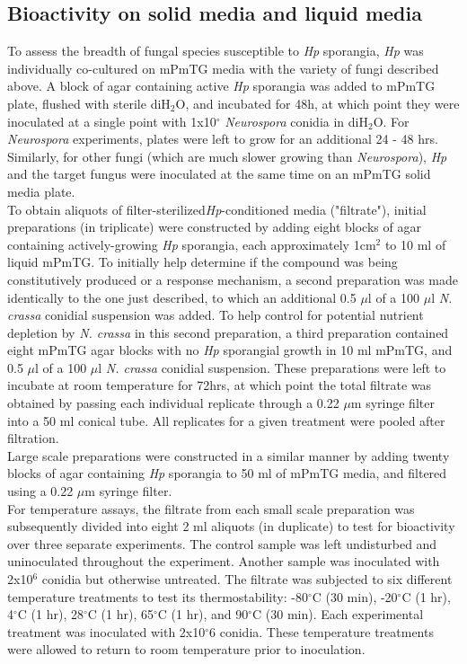 \subsection*{Bioactivity on solid media and liquid media}
To assess the breadth of fungal species susceptible to \textit{Hp} sporangia, \textit{Hp} was individually co-cultured on mPmTG media with the variety of fungi described above. A block of agar containing active \textit{Hp} sporangia was added to mPmTG plate, flushed with sterile diH$_{2}$O, and incubated for 48h, at which point they were inoculated at a single point with 1x10$^{\circ}$ \textit{Neurospora} conidia in diH$_{2}$O. For \textit{Neurospora} experiments, plates were left to grow for an additional 24 - 48 hrs.\\
\indent Similarly, for other fungi (which are much slower growing than \textit{Neurospora}), \textit{Hp} and the target fungus were inoculated at the same time on an mPmTG solid media plate.\\
\indent To obtain aliquots of filter-sterilized\textit{Hp}-conditioned media ("filtrate"), initial preparations (in triplicate) were constructed by adding eight blocks of agar containing actively-growing \textit{Hp} sporangia, each approximately 1cm$^{2}$ to 10 ml of liquid mPmTG. To initially help determine if the compound was being constitutively produced or a response mechanism, a second preparation was made identically to the one just described, to which an additional 0.5 $\mu$l of a 100 $\mu$l  \textit{N. crassa} conidial suspension was added. To help control for potential nutrient depletion by \textit{N. crassa} in this second preparation, a third preparation contained eight mPmTG agar blocks with no \textit{Hp} sporangial growth in 10 ml mPmTG, and 0.5 $\mu$l of a 100 $\mu$l \textit{N. crassa} conidial suspension. These preparations were left to incubate at room temperature for 72hrs, at which point the total filtrate was obtained by passing each individual replicate through a 0.22 $\mu$m syringe filter into a 50 ml conical tube. All replicates for a given treatment were pooled after filtration. \\
\indent Large scale preparations were constructed in a similar manner by adding twenty blocks of agar containing \textit{Hp} sporangia to 50 ml of mPmTG media, and filtered using a 0.22 $\mu$m syringe filter.\\
\indent For temperature assays, the filtrate from each small scale preparation was subsequently divided into eight 2 ml aliquots (in duplicate) to test for bioactivity over three separate experiments. The control sample was left undisturbed and uninoculated throughout the experiment. Another sample was inoculated with 2x10$^{6}$ conidia but otherwise untreated. The filtrate was subjected to six different temperature treatments to test its thermostability: -80$^{\circ}$C (30 min), -20$^{\circ}$C (1 hr), 4$^{\circ}$C (1 hr), 28$^{\circ}$C (1 hr), 65$^{\circ}$C (1 hr), and 90$^{\circ}$C (30 min). Each experimental treatment was inoculated with 2x10$^{\circ}$6 conidia. These temperature treatments were allowed to return to room temperature prior to inoculation.\\
